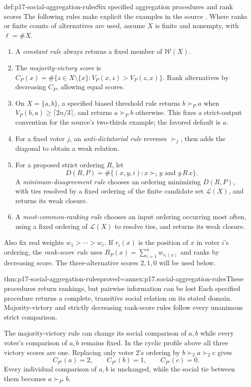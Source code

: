 \begin{hbdefinition}{def:p17-social-aggregation-rules}{Six specified aggregation procedures and rank scores}
The following rules make explicit the examples in the source
\cite[pp.~123--125]{Rubinstein2015LectureNotes}.
Where ranks or finite counts of alternatives are used, assume \(X\) is
finite and nonempty, with \(\ell=\#X\).
\begin{enumerate}
\item A \emph{constant rule} always returns a fixed member of \(\mathcal W(X)\).
\item The \emph{majority-victory score} is
      \(C_P(x)=\#\{z\in X\setminus\{x\}:V_P(x,z)>V_P(z,x)\}\).
      Rank alternatives by decreasing \(C_P\), allowing equal scores.
\item On \(X=\{a,b\}\), a specified biased threshold rule returns
      \(b\succ_Pa\) when \(V_P(b,a)\geq\lceil2n/3\rceil\), and returns
      \(a\succ_Pb\) otherwise. This fixes a strict-output convention for
      the source's two-thirds example; the favored default is \(a\).
\item For a fixed voter \(j\), an \emph{anti-dictatorial rule} reverses
      \(\succ_j\), then adds the diagonal to obtain a weak relation.
\item For a proposed strict ordering \(R\), let
      \[
       D(R,P)=\#\{(x,y,i):x\succ_i y\text{ and }y\,R\,x\}.
      \]
      A \emph{minimum-disagreement rule} chooses an ordering minimizing
      \(D(R,P)\), with ties resolved by a fixed ordering of the finite
      candidate set \(\mathcal L(X)\), and returns its weak closure.
\item A \emph{most-common-ranking rule} chooses an input ordering occurring
      most often, using a fixed ordering of \(\mathcal L(X)\) to resolve
      ties, and returns its weak closure.
\end{enumerate}
Also fix real weights \(w_1>\cdots>w_\ell\). If \(r_i(x)\) is the
position of \(x\) in voter \(i\)'s ordering, the \emph{rank-score rule}
uses \(B_P(x)=\sum_{i=1}^n w_{r_i(x)}\) and ranks by decreasing score.
The three-alternative scores \(2,1,0\) will be used below.
\end{hbdefinition}

\begin{hbtheorem}{thm:p17-social-aggregation-rules}{proved=annex:p17.social-aggregation-rules}{These procedures return rankings, but pairwise information can be lost}
Each specified procedure returns a complete, transitive social relation
on its stated domain. Majority-victory and strictly decreasing rank-score
rules follow every unanimous strict comparison.

The majority-victory rule can change its social comparison of \(a,b\)
while every voter's comparison of \(a,b\) remains fixed. In the cyclic
profile above all three victory scores are one. Replacing only voter 2's
ordering by \(b\succ_2a\succ_2c\) gives
\[
 C_{P'}(a)=2,\qquad C_{P'}(b)=1,\qquad C_{P'}(c)=0.
\]
Every individual comparison of \(a,b\) is unchanged, while the social
tie between them becomes \(a\succ_{P'}b\).
\end{hbtheorem}

